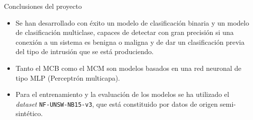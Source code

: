 \begin{frame}{Conclusiones del proyecto}
	\begin{itemize}
		\item Se han desarrollado con éxito un modelo de clasificación binaria y un modelo de clasificación multiclase, capaces de detectar con gran precisión si una conexión a un sistema es benigna o maligna y de dar un clasificación previa del tipo de intrusión que se está produciendo.
		 \vspace{10mm}
		\item Tanto el MCB como el MCM son modelos basados en una red neuronal de tipo MLP (Perceptrón multicapa).
		 \vspace{10mm}
		\item Para el entrenamiento y la evaluación de los modelos se ha utilizado el \textit{dataset} \texttt{NF-UNSW-NB15-v3}, que está constituido por datos de origen semi-sintético.
	\end{itemize}
\end{frame}